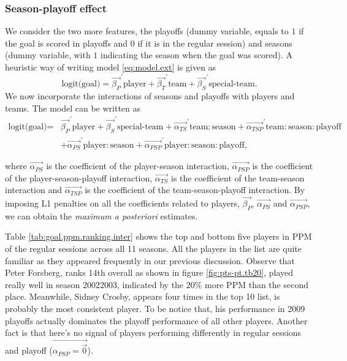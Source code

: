 \subsubsection{Season-playoff effect}
We consider the two more features, the playoffs (dummy variable, equals to $1$ if the goal is scored in playoffs and $0$ if it is in the regular session) and seasons (dummy variable, with $1$ indicating the season when the goal was scored). A heuristic way of writing model \eqref{eq:model.ext} is given as
\begin{equation*}
\text{logit(goal)} =  \vec{\beta_P}^\prime \text{player} + \vec{\beta_T}^\prime \text{team} + \vec{\beta_S}^\prime \text{special-team}.
\end{equation*}
We now incorporate the interactions of seasons and playoffs with players and teams. The model can be written as
\begin{equation}
\begin{aligned}
\text{logit(goal)} = & \vec{\beta_P}^\prime \text{player} +  \vec{\beta_S}^\prime \text{special-team} + \vec{\alpha_{TS}}^\prime \text{team}:\text{season} +  \vec{\alpha_{TSP}}^\prime \text{team}:\text{season}:\text{playoff} \\
& +\vec{\alpha_{PS}}^\prime \text{player}:\text{season} +  \vec{\alpha_{PSP}}^\prime \text{player}:\text{season}:\text{playoff}   ,
\end{aligned}
\label{eq:model.inter}
\end{equation}

where  $\vec{\alpha_{PS}}$ is the coefficient of the player-season interaction, $\vec{\alpha_{PSP}}$ is the coefficient of the player-season-playoff interaction, $\vec{\alpha_{TS}}$ is the coefficient of the team-season interaction and $\vec{\alpha_{TSP}}$ is the coefficient of the team-season-playoff interaction. By imposing L1 penalties on all the coefficients related to players, $\vec{\beta_P}$, $\vec{\alpha_{PS}}$ and $\vec{\alpha_{PSP}}$, we can obtain the {\em maximum a posteriori} estimates.

Table \ref{tab:goal.ppm.ranking.inter} shows the top and bottom five players in PPM of the regular sessions across all 11 seasons. All the players in the list are quite familiar as they appeared frequently in our previous discussion. Observe that Peter Forsberg, ranks 14th overall as shown in figure \ref{fig:pts-pt.tb20}, played really well in season 20022003, indicated by the $20\%$ more PPM than the second place. Meanwhile, Sidney Crosby, appears four times in the top 10 list, is probably the most consistent player. To be notice that, his performance in 2009 playoffs actually dominates the playoff performance of all other players. Another fact is that here's no signal of players performing differently in regular sessions and playoff ($\vec{\alpha_{PSP}=\vec{0}}$). 

